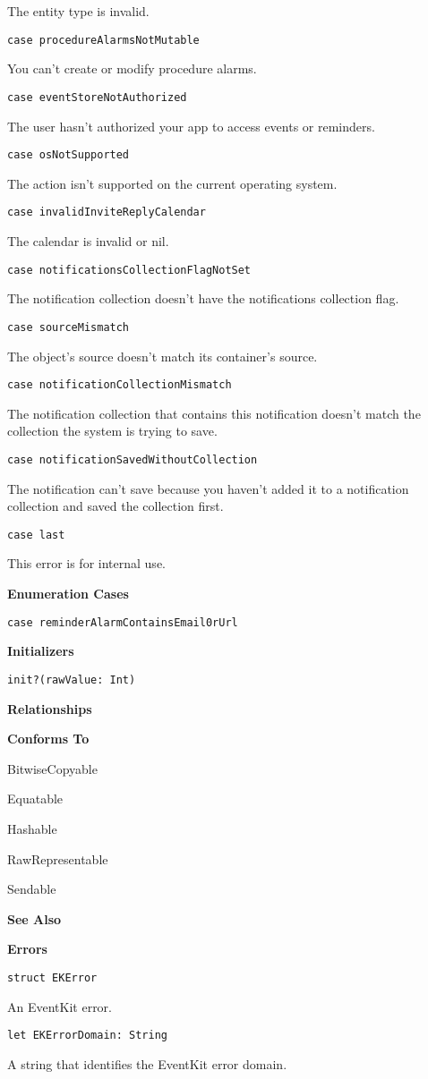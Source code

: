 \documentclass{article}
\begin{document}
The entity type is invalid.

\texttt{case procedureAlarmsNotMutable}

You can't create or modify procedure alarms.

\texttt{case eventStoreNotAuthorized}

The user hasn't authorized your app to access events or reminders.

\texttt{case osNotSupported}

The action isn't supported on the current operating system.

\texttt{case invalidInviteReplyCalendar}

The calendar is invalid or nil.

\texttt{case notificationsCollectionFlagNotSet}

The notification collection doesn't have the notifications collection flag.

\texttt{case sourceMismatch}

The object's source doesn't match its container's source.

\texttt{case notificationCollectionMismatch}

The notification collection that contains this notification doesn't match the collection the system is trying to
save.

\texttt{case notificationSavedWithoutCollection}

The notification can't save because you haven't added it to a notification collection and saved the collection
first.

\texttt{case last}

This error is for internal use.

\textbf{Enumeration Cases}

\texttt{case reminderAlarmContainsEmail0rUrl}

\textbf{Initializers}

\texttt{init?(rawValue: Int)}

\textbf{Relationships}

\textbf{Conforms To}

BitwiseCopyable

Equatable

Hashable

RawRepresentable

Sendable

\textbf{See Also}

\textbf{Errors}

\texttt{struct EKError}

An EventKit error.

\texttt{let EKErrorDomain: String}

A string that identifies the EventKit error domain.

\newpage
\end{document}
